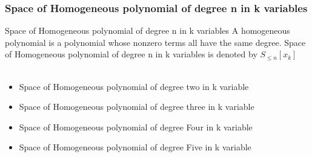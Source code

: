 \documentclass{beamer}
\begin{document}
\begin{frame}
\frametitle{Space of Homogeneous polynomial of degree n in k variables}
\begin{block}{\Large{Space of Homogeneous polynomial of degree n in k variables}}
A homogeneous polynomial is a polynomial whose nonzero terms all have the same degree.
Space of Homogeneous polynomial of degree n in k variables is denoted by $S_{\leq n}[x_k]$\\
\\
\begin{itemize}
    \item Space of Homogeneous polynomial of degree two in k variable
     \item Space of Homogeneous polynomial of degree three in k variable
      \item Space of Homogeneous polynomial of degree Four in k variable
     \item Space of Homogeneous polynomial of degree Five in k variable
\end{itemize}
\end{block}
\end{frame}
\end{document}
